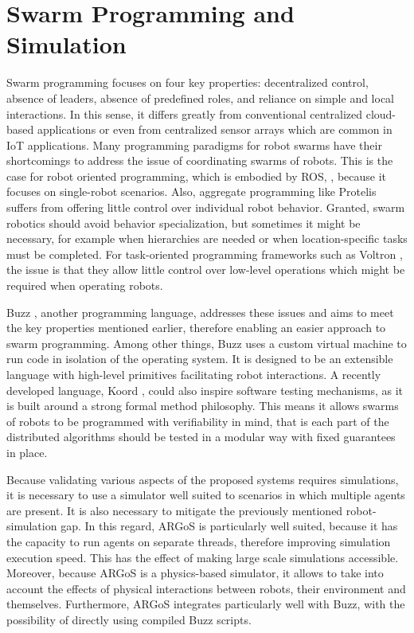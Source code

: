 \section{Swarm Programming and Simulation}
Swarm programming focuses on four key properties: decentralized control, absence of leaders, absence of predefined roles, and reliance on simple and local interactions. In this sense, it differs greatly from conventional centralized cloud-based applications or even from centralized sensor arrays which are common in \ac{IoT} applications. Many programming paradigms for robot swarms have their shortcomings to address the issue of coordinating swarms of robots. This is the case for robot oriented programming, which is embodied by ROS, \cite{quigley2009ros}, because it focuses on single-robot scenarios. Also, aggregate programming like Protelis \cite{pianini2015protelis} suffers from offering little control over individual robot behavior. Granted, swarm robotics should avoid behavior specialization, but sometimes it might be necessary, for example when hierarchies are needed or when location-specific tasks must be completed. For task-oriented programming frameworks such as Voltron \cite{mottola2014team}, the issue is that they allow little control over low-level operations which might be required when operating robots.

Buzz \cite{pinciroliBuzz2016}, another programming language, addresses these issues and aims to meet the key properties mentioned earlier, therefore enabling an easier approach to swarm programming. Among other things, Buzz uses a custom virtual machine to run code in isolation of the operating system. It is designed to be an extensible language with high-level primitives facilitating robot interactions. A recently developed language, Koord \cite{ghosh2020koord}, could also inspire software testing mechanisms, as it is built around a strong formal method philosophy. This means it allows swarms of robots to be programmed with verifiability in mind, that is each part of the distributed algorithms should be tested in a modular way with fixed guarantees in place.

Because validating various aspects of the proposed systems requires simulations, it is necessary to use a simulator well suited to scenarios in which multiple agents are present. It is also necessary to mitigate the previously mentioned robot-simulation gap. In this regard, ARGoS  \cite{Pinciroli:SI2012} is particularly well suited, because it has the capacity to run agents on separate threads, therefore improving simulation execution speed. This has the effect of making large scale simulations accessible. Moreover, because ARGoS is a physics-based simulator, it allows to take into account the effects of physical interactions between robots, their environment and themselves. Furthermore, ARGoS integrates particularly well with Buzz, with the possibility of directly using compiled Buzz scripts.

